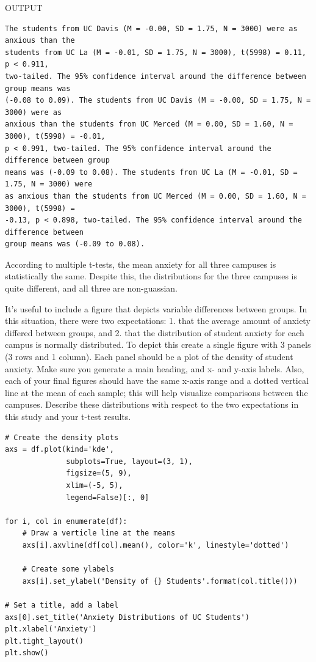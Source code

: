 \documentclass[onecolumn,10pt]{jhwhw}
\begin{document}
\noindent OUTPUT
\begin{lstlisting}[language={}]
The students from UC Davis (M = -0.00, SD = 1.75, N = 3000) were as anxious than the
students from UC La (M = -0.01, SD = 1.75, N = 3000), t(5998) = 0.11, p < 0.911,
two-tailed. The 95% confidence interval around the difference between group means was
(-0.08 to 0.09). The students from UC Davis (M = -0.00, SD = 1.75, N = 3000) were as
anxious than the students from UC Merced (M = 0.00, SD = 1.60, N = 3000), t(5998) = -0.01,
p < 0.991, two-tailed. The 95% confidence interval around the difference between group
means was (-0.09 to 0.08). The students from UC La (M = -0.01, SD = 1.75, N = 3000) were
as anxious than the students from UC Merced (M = 0.00, SD = 1.60, N = 3000), t(5998) =
-0.13, p < 0.898, two-tailed. The 95% confidence interval around the difference between
group means was (-0.09 to 0.08).
\end{lstlisting}
According to multiple t-tests, the mean anxiety for all three campuses is statistically the same. Despite this, the distributions for the three campuses is quite different, and all three are non-guassian.

\problem{}
It’s useful to include a figure that depicts variable differences between groups. In this situation, there were two expectations: 1. that the average amount of anxiety differed between groups, and 2. that the distribution of student anxiety for each campus is normally distributed. To depict this create a single figure with 3 panels (3 rows and 1 column). Each panel should be a plot of the density of student anxiety. Make sure you generate a main heading, and x- and y-axis labels. Also, each of your final figures should have the same x-axis range and a dotted vertical line at the mean of each sample; this will help visualize comparisons between the campuses. Describe these distributions with respect to the two expectations in this study and your t-test results.
\solution{}

\begin{lstlisting}
# Create the density plots
axs = df.plot(kind='kde',
              subplots=True, layout=(3, 1),
              figsize=(5, 9),
              xlim=(-5, 5),
              legend=False)[:, 0]

for i, col in enumerate(df):
    # Draw a verticle line at the means
    axs[i].axvline(df[col].mean(), color='k', linestyle='dotted')

    # Create some ylabels
    axs[i].set_ylabel('Density of {} Students'.format(col.title()))

# Set a title, add a label
axs[0].set_title('Anxiety Distributions of UC Students')
plt.xlabel('Anxiety')
plt.tight_layout()
plt.show()
\end{lstlisting}
\end{document}
